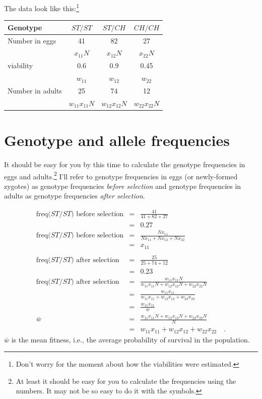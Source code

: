 The data look like this:\footnote{Don't worry for the moment about how
the viabilities were estimated.}

\begin{center}
\begin{tabular}{l|ccc}
\hline\hline
Genotype         & $ST/ST$    & $ST/CH$    & $CH/CH$    \\
\hline
Number in eggs   & 41       & 82       & 27       \\
                 & $x_{11}N$  & $x_{12}N$  & $x_{22}N$  \\
viability        & 0.6      & 0.9      & 0.45     \\
                 & $w_{11}$   & $w_{12}$   & $w_{22}$   \\
Number in adults & 25       & 74       & 12       \\
                 & $w_{11}x_{11}N$ & $w_{12}x_{12}N$ & $w_{22}x_{22}N$ \\
\hline
\end{tabular}
\end{center}

\section*{Genotype and allele frequencies}

It should be easy for you by this time to calculate the genotype
frequencies in eggs and adults.\footnote{At least it should be easy
  for you to calculate the frequencies using the numbers. It may not
  be so easy to do it with the symbols.} I'll refer to genotype
frequencies in eggs (or newly-formed zygotes) as genotype frequencies
{\it before selection\/} and genotype frequencies in adults as
genotype frequencies {\it after selection}.

\begin{eqnarray*}
\mbox{freq($ST/ST$) before selection}
 &=& \frac{41}{41 + 82 + 27} \\
 &=& 0.27 \\
\mbox{freq($ST/ST$) before selection}
 &=& \frac{Nx_{11}}{Nx_{11} + Nx_{12} + Nx_{22}} \\
 &=& x_{11} \\
 && \\
\mbox{freq($ST/ST$) after selection}
 &=& \frac{25}{25 + 74 +12} \\
 &=& 0.23 \\
\mbox{freq($ST/ST$) after selection}
 &=& \frac{w_{11}x_{11}N}{w_{11}x_{11}N + w_{12}x_{12}N + w_{22}x_{22}N} \\
 &=& \frac{w_{11}x_{11}}{w_{11}x_{11} + w_{12}x_{12} +
 w_{22}x_{22}} \\
 &=& \frac{w_{11}x_{11}}{\bar w} \\
 \bar w &=& \frac{w_{11}x_{11}N + w_{12}x_{12}N + w_{22}x_{22}N}{N} \\
        &=& w_{11}x_{11} + w_{12}x_{12} + w_{22}x_{22} \quad .
\end{eqnarray*}
$\bar w$ is the mean fitness, i.e., the average probability of
survival in the population.

